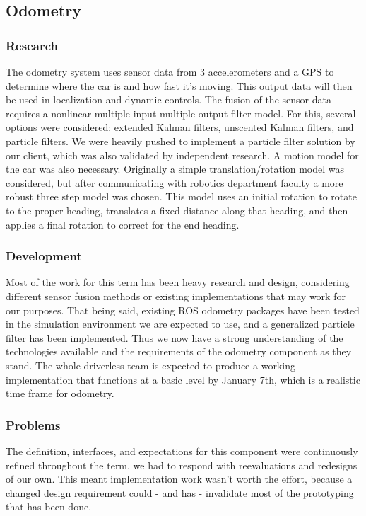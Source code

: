 \documentclass[10pt, onecolumn, draftclsnofoot, letterpaper,compsoc]{IEEEtran}
\begin{document}
\subsection{Odometry}
\subsubsection{Research}
The odometry system uses sensor data from 3 accelerometers and a GPS to determine where the car is and how fast it’s moving. This output data will then be used in localization and dynamic controls. The fusion of the sensor data requires a nonlinear multiple-input multiple-output filter model. For this, several options were considered: extended Kalman filters, unscented Kalman filters, and particle filters. We were heavily pushed to implement a particle filter solution by our client, which was also validated by independent research.\newline
A motion model for the car was also necessary. Originally a simple translation/rotation model was considered, but after communicating with robotics department faculty a more robust three step model was chosen. This model uses an initial rotation to rotate to the proper heading, translates a fixed distance along that heading, and then applies a final rotation to correct for the end heading.
\subsubsection{Development}
Most of the work for this term has been heavy research and design, considering different sensor fusion methods or existing implementations that may work for our purposes. That being said, existing ROS odometry packages have been tested in the simulation environment we are expected to use, and a generalized particle filter has been implemented. Thus we now have a strong understanding of the technologies available and the requirements of the odometry component as they stand. The whole driverless team is expected to produce a working implementation that functions at a basic level by January 7th, which is a realistic time frame for odometry. 
\subsubsection{Problems}
The definition, interfaces, and expectations for this component were continuously refined throughout the term, we had to respond with reevaluations and redesigns of our own. This meant implementation work wasn’t worth the effort, because a changed design requirement could - and has - invalidate most of the prototyping that has been done.
\end{document}
